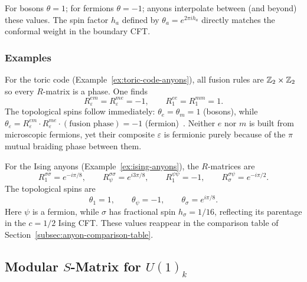 \noindent
For bosons $\theta = 1$; for fermions $\theta = -1$; anyons interpolate
between (and beyond) these values.  The spin factor $h_a$ defined by
$\theta_a = e^{2\pi i h_a}$ directly matches the conformal weight in the
boundary CFT.

\subsubsection*{Examples}

\begin{example}
\label{ex:toric-code-braiding}
For the toric code (Example~\ref{ex:toric-code-anyons}), all fusion rules are
$\mathbb{Z}_2 \times \mathbb{Z}_2$ so every $R$-matrix is a phase.  One finds
\begin{equation}
\label{eq:toric-braiding}
    R^{em}_\varepsilon = R^{me}_\varepsilon = -1, \qquad
    R^{ee}_1 = R^{mm}_1 = 1.
\end{equation}
The topological spins follow immediately:
$\theta_e = \theta_m = 1$ (bosons), while
$\theta_\varepsilon = R^{em}_\varepsilon \cdot R^{me}_\varepsilon \cdot
(\text{fusion phase}) = -1$
(fermion)~\cite{Kitaev2003FaultTolerant}.  Neither $e$ nor $m$ is built from
microscopic fermions, yet their composite $\varepsilon$ is fermionic purely
because of the $\pi$ mutual braiding phase between them.
\end{example}

\begin{example}
\label{ex:ising-braiding}
For the Ising anyons (Example~\ref{ex:ising-anyons}), the $R$-matrices are
\begin{equation}
\label{eq:ising-r-matrices}
    R^{\sigma\sigma}_1 = e^{-i\pi/8}, \qquad
    R^{\sigma\sigma}_\psi = e^{i 3\pi/8}, \qquad
    R^{\psi\psi}_1 = -1, \qquad
    R^{\sigma\psi}_\sigma = e^{-i\pi/2}.
\end{equation}
The topological spins are~\cite{NayakSimonSternFreedmanDasSarma2008NonabelianAnyons}
\begin{equation}
\label{eq:ising-spins}
    \theta_1 = 1, \qquad \theta_\psi = -1, \qquad
    \theta_\sigma = e^{i\pi/8}.
\end{equation}
Here $\psi$ is a fermion, while $\sigma$ has fractional spin $h_\sigma = 1/16$,
reflecting its parentage in the $c = 1/2$ Ising CFT.
These values reappear in the comparison table of
Section~\ref{subsec:anyon-comparison-table}.
\end{example}

\subsection{Modular $S$-Matrix for $U(1)_k$}
\label{subsec:modular-s-matrix}


